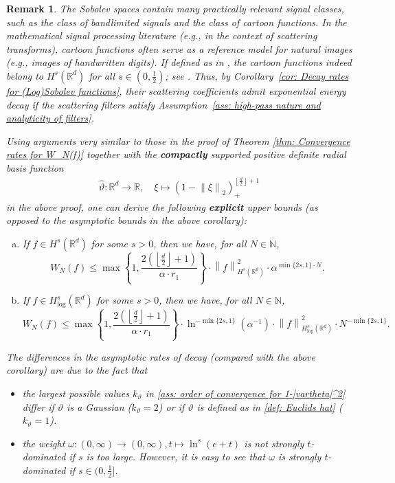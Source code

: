 \documentclass[11pt]{amsart}
\newcommand{\R}{{\mathbb{R}}}
\newcommand{\N}{\mathbb{N}}
\newcommand{\norm}[1]{\ensuremath{\left\lVert\text{}#1\text{}\right\rVert}}
\newcommand{\set}[1]{\ensuremath{\left\{\text{}#1\text{}\right\}}}
\newtheorem{remark}[theorem]{Remark}
\newenvironment{proof sketch} {\textit{Proof sketch.}}{}
\begin{document}
  \begin{remark}
  	The Sobolev spaces contain many practically relevant signal classes, such
  	as the class of bandlimited signals and the class of cartoon functions.
  	In the mathematical signal processing literature (e.g.,
  	\cite{wiatowski2017energy,wiatowski2016discrete,grohs2016deep} in the context
  	of scattering transforms), cartoon functions often serve as a reference
  	model for natural images (e.g., images of handwritten digits). If defined
  	as in \cite[Definition 1]{wiatowski2017energy}, the cartoon functions indeed
  	belong to $H^{s}({\mathbb{R}}^{d})$ for all $s \in (0,\frac{1}{2})$; see
  	\cite[Lemma 1]{wiatowski2017energy}. Thus, by Corollary~\ref{cor: Decay rates for (Log)Sobolev functions}, their scattering coefficients
  	admit exponential energy decay if the scattering filters satisfy Assumption~\ref{ass: high-pass nature and analyticity of filters}.
  	
    Using arguments very similar to those in the proof of Theorem \ref{thm: Convergence rates for W_N(f)} together with the \textbf{compactly} supported positive definite radial basis function 
    \begin{align}\label{def: Euclids hat}
      \widehat{\vartheta}: \R^d \to \R, \quad \xi \mapsto \left(1-\norm{\xi}_2\right)_+^{\left\lfloor\frac{d}{2}\right\rfloor+1}
    \end{align}
    in the above proof, one can derive the following \textbf{explicit} upper bounds (as opposed to the asymptotic bounds in the above corollary):
    \begin{enumerate}[a)]
      \item If $f \in H^s(\R^d)$ for some $s>0$, then we have, for all $N \in \N$,
      \[W_N(f) \leq \max\set{1,\frac{2\left(\left\lfloor\frac{d}{2}\right\rfloor+1\right)}{\alpha \cdot r_1}} \cdot \norm{f}_{H^s(\R^d)}^2 \cdot \alpha^{\min\{2s,1\} \cdot N}.\] 
      \item If $f \in H^s_{\log}(\R^d)$ for some $s>0$, then we have, for all $N \in \N$, 
      \[W_N(f) \leq \max\set{1,\frac{2\left(\left\lfloor\frac{d}{2}\right\rfloor+1\right)}{\alpha \cdot r_1}} \cdot \ln^{-\min\{2s,1\}}(\alpha^{-1}) \cdot \norm{f}_{H^s_{\log}(\R^d)}^2 \cdot N^{-\min\{2s,1\}}.\] 
    \end{enumerate}
    The differences in the asymptotic rates of decay (compared with the above corollary) are due to the fact that
    \begin{itemize}
      \item the largest possible values $k_\vartheta$ in \eqref{ass: order of convergence for 1-|vartheta|^2} differ if $\vartheta$ is a Gaussian ($k_\vartheta=2$) or if $\vartheta$ is defined as in \eqref{def: Euclids hat} ($k_\vartheta=1$).
      \item the weight $\omega: (0,\infty)\to (0,\infty), t \mapsto \ln^{s}(e+t)$ is not strongly $t$-dominated if $s$ is too large. However, it is easy to see that $\omega$ is strongly $t$-dominated if $s \in (0,\frac{1}{2}]$.
    \end{itemize}
  \end{remark}
  
\end{document}
